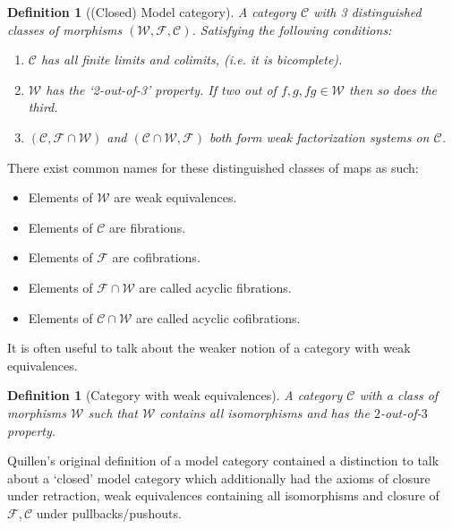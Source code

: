 \documentclass[12pt]{report}
\numberwithin{equation}{section}
\newtheorem{definition}[dummy]{Definition}
\begin{document}
	
	\begin{definition}[(Closed) Model category]
		A category $\mathcal{C}$ with 3 distinguished classes of morphisms $(\mathcal{W, F ,C})$. Satisfying the following conditions:
		\begin{enumerate}
			\item $\mathcal{C}$ has all finite limits and colimits, (i.e. it is bicomplete).
			\item $\mathcal{W}$ has the `2-out-of-3' property. If two out of $f, g, fg \in \mathcal{W}$ then so does the third.
			\item $(\mathcal{C},\mathcal{F}\cap \mathcal{W})$ and $(\mathcal{C}\cap \mathcal{W},\mathcal{F})$ both form weak factorization systems on $\mathcal{C}$.
		\end{enumerate}
	\end{definition}	
		
	There exist common names for these distinguished classes of maps as such:
	\begin{itemize}
		\item Elements of $\mathcal{W}$ are weak equivalences. 
		\item Elements of $\mathcal{C}$ are fibrations.
		\item Elements of $\mathcal{F} $ are cofibrations.
		\item Elements of $\mathcal{F} \cap \mathcal{W}$ are called acyclic fibrations.
		\item Elements of $\mathcal{C} \cap \mathcal{W}$ are called acyclic cofibrations.
	\end{itemize}
	
	It is often useful to talk about the weaker notion of a category with weak equivalences.
	\begin{definition}[Category with weak equivalences]\label{def:catweak}
		A category \( \mathcal{C} \) with a class of morphisms \( \mathcal{W} \) such that \( \mathcal{W} \) contains all isomorphisms and has the \( 2 \)-out-of-\( 3 \) property.
	\end{definition}
	
	Quillen's original definition of a model category contained a distinction to talk about a `closed' model category which additionally had the axioms of closure under retraction, weak equivalences containing all isomorphisms and closure of $\mathcal{F,C}$ under pullbacks/pushouts. 
	
\end{document}
